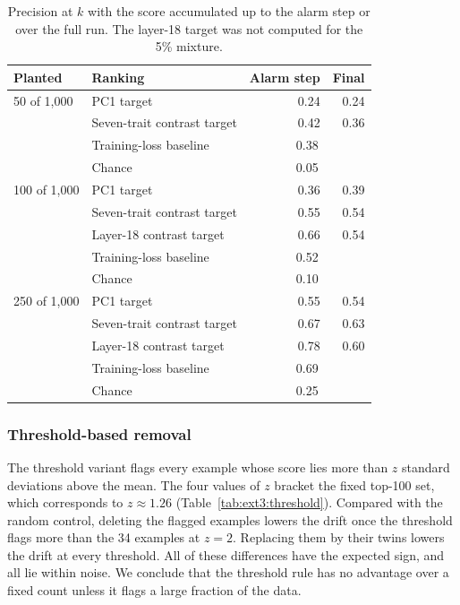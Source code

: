 \begin{table}[htbp]
\centering
\small
\caption{Precision at $k$ with the score accumulated up to the alarm step or over the full run. The layer-18 target was not computed for the 5\% mixture.}
\label{tab:ext3:recovery}
\begin{tabular}{llrr}
\toprule
Planted & Ranking & Alarm step & Final \\
\midrule
50 of 1,000  & PC1 target                 & 0.24 & 0.24 \\
             & Seven-trait contrast target & 0.42 & 0.36 \\
             & Training-loss baseline     & \multicolumn{2}{c}{0.38} \\
             & Chance                     & \multicolumn{2}{c}{0.05} \\
\midrule
100 of 1,000 & PC1 target                 & 0.36 & 0.39 \\
             & Seven-trait contrast target & 0.55 & 0.54 \\
             & Layer-18 contrast target   & 0.66 & 0.54 \\
             & Training-loss baseline     & \multicolumn{2}{c}{0.52} \\
             & Chance                     & \multicolumn{2}{c}{0.10} \\
\midrule
250 of 1,000 & PC1 target                 & 0.55 & 0.54 \\
             & Seven-trait contrast target & 0.67 & 0.63 \\
             & Layer-18 contrast target   & 0.78 & 0.60 \\
             & Training-loss baseline     & \multicolumn{2}{c}{0.69} \\
             & Chance                     & \multicolumn{2}{c}{0.25} \\
\bottomrule
\end{tabular}
\end{table}

\FloatBarrier
\subsubsection{Threshold-based removal}

The threshold variant flags every example whose score lies more than $z$ standard deviations above the mean. The four values of $z$ bracket the fixed top-100 set, which corresponds to $z\approx1.26$ (Table~\ref{tab:ext3:threshold}). Compared with the random control, deleting the flagged examples lowers the drift once the threshold flags more than the 34 examples at $z=2$. Replacing them by their twins lowers the drift at every threshold. All of these differences have the expected sign, and all lie within noise. We conclude that the threshold rule has no advantage over a fixed count unless it flags a large fraction of the data.

